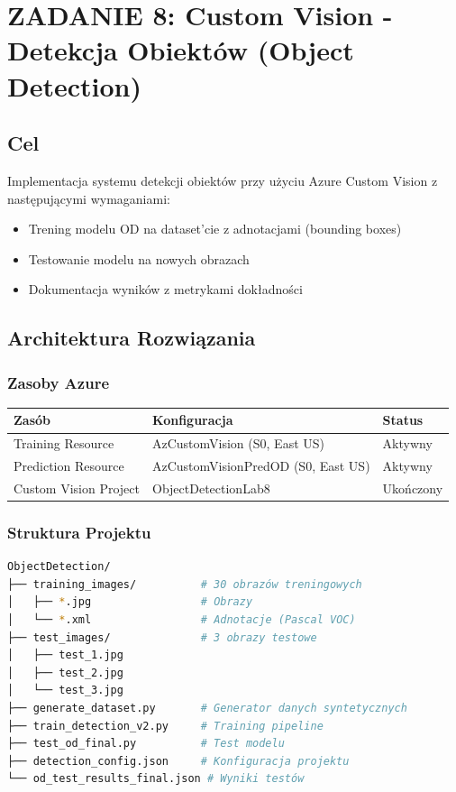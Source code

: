 \section{ZADANIE 8: Custom Vision - Detekcja Obiektów (Object Detection)}

\subsection{Cel}

Implementacja systemu detekcji obiektów przy użyciu Azure Custom Vision z następującymi wymaganiami:
\begin{itemize}
	\item Trening modelu OD na dataset'cie z adnotacjami (bounding boxes)
	\item Testowanie modelu na nowych obrazach
	\item Dokumentacja wyników z metrykami dokładności
\end{itemize}

\subsection{Architektura Rozwiązania}

\subsubsection{Zasoby Azure}

\begin{center}
	\begin{tabular}{|l|l|l|}
		\hline
		\textbf{Zasób} & \textbf{Konfiguracja} & \textbf{Status} \\
		\hline
		Training Resource & AzCustomVision (S0, East US) & Aktywny \\
		Prediction Resource & AzCustomVisionPredOD (S0, East US) & Aktywny \\
		Custom Vision Project & ObjectDetectionLab8 & Ukończony \\
		\hline
	\end{tabular}
\end{center}

\subsubsection{Struktura Projektu}

\begin{lstlisting}[language=bash]
ObjectDetection/
├── training_images/          # 30 obrazów treningowych
│   ├── *.jpg                 # Obrazy
│   └── *.xml                 # Adnotacje (Pascal VOC)
├── test_images/              # 3 obrazy testowe
│   ├── test_1.jpg
│   ├── test_2.jpg
│   └── test_3.jpg
├── generate_dataset.py       # Generator danych syntetycznych
├── train_detection_v2.py     # Training pipeline
├── test_od_final.py          # Test modelu
├── detection_config.json     # Konfiguracja projektu
└── od_test_results_final.json # Wyniki testów
\end{lstlisting}

